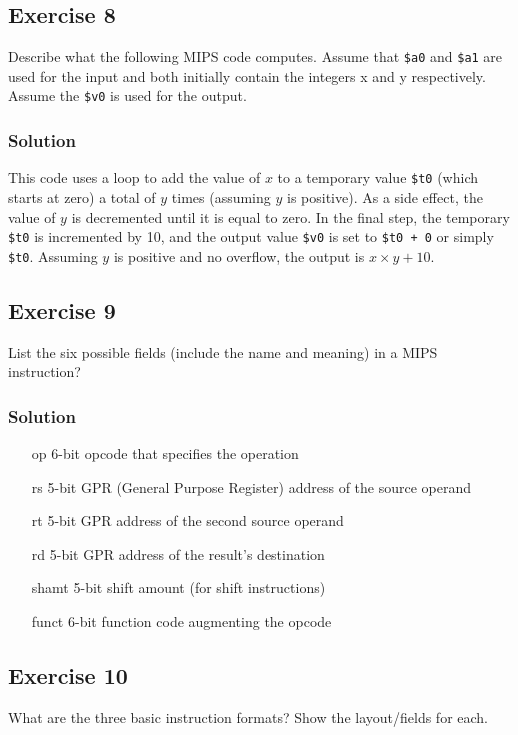 \documentclass[12pt]{article}
\begin{document}
\subsection*{Exercise 8}
Describe what the following MIPS code computes. Assume that {\tt \$a0} and {\tt \$a1} are used for the input and both initially contain the integers x and y respectively. Assume the {\tt\$v0} is used for the output.

\subsubsection*{Solution}
This code uses a loop to add the value of $x$ to a temporary value {\tt\$t0} (which starts at zero) a total of $y$ times (assuming $y$ is positive). As a side effect, the value of $y$ is decremented until it is equal to zero. In the final step, the temporary {\tt \$t0} is incremented by 10, and the output value {\tt \$v0} is set to {\tt \$t0 + 0} or simply {\tt\$t0}. Assuming $y$ is positive and no overflow, the output is $x \times y + 10$.

\subsection*{Exercise 9}
List the six possible fields (include the name and meaning) in a MIPS instruction?
\subsubsection*{Solution}
\begin{itemize}
\item[op] 6-bit opcode that specifies the operation
\item[rs] 5-bit GPR (General Purpose Register) address of the source operand
\item[rt] 5-bit GPR address of the second source operand
\item[rd] 5-bit GPR address of the result's destination
\item[shamt] 5-bit shift amount (for shift instructions)
\item[funct] 6-bit function code augmenting the opcode
\end{itemize}

\subsection*{Exercise 10}
What are the three basic instruction formats? Show the layout/fields for each.
\end{document}
